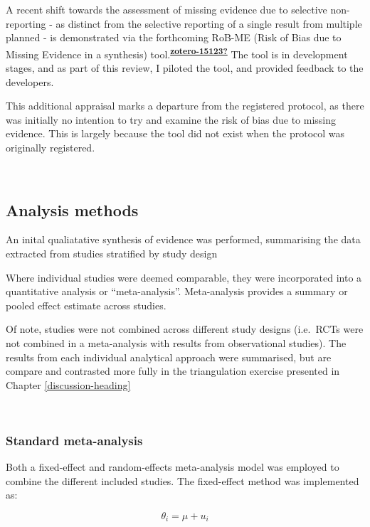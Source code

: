 \documentclass[a4paper, twoside]{templates/ociamthesis}
\begin{document}
A recent shift towards the assessment of missing evidence due to selective non-reporting - as distinct from the selective reporting of a single result from multiple planned - is demonstrated via the forthcoming RoB-ME (Risk of Bias due to Missing Evidence in a synthesis) tool.\textsuperscript{\protect\hyperlink{ref-zotero-15123}{\textbf{zotero-15123?}}} The tool is in development stages, and as part of this review, I piloted the tool, and provided feedback to the developers.

This additional appraisal marks a departure from the registered protocol, as there was initially no intention to try and examine the risk of bias due to missing evidence. This is largely because the tool did not exist when the protocol was originally registered.

~

\hypertarget{analysis-methods}{%
\subsection{Analysis methods}\label{analysis-methods}}

An inital qualiatative synthesis of evidence was performed, summarising the data extracted from studies stratified by study design

Where individual studies were deemed comparable, they were incorporated into a quantitative analysis or ``meta-analysis''. Meta-analysis provides a summary or pooled effect estimate across studies.

Of note, studies were not combined across different study designs (i.e.~RCTs were not combined in a meta-analysis with results from observational studies). The results from each individual analytical approach were summarised, but are compare and contrasted more fully in the triangulation exercise presented in Chapter \ref{discussion-heading}

~

\hypertarget{standard-meta-analysis}{%
\subsubsection{Standard meta-analysis}\label{standard-meta-analysis}}

Both a fixed-effect and random-effects meta-analysis model was employed to combine the different included studies. The fixed-effect method was implemented as:

\begin{equation}
  \theta_i = \mu + u_i
  \label{eq:meta-analysis-random}
\end{equation}
\end{document}

